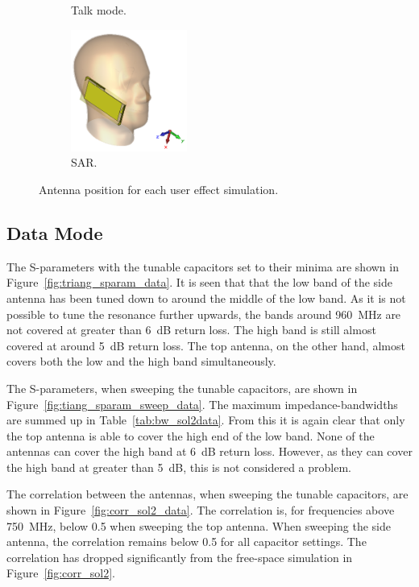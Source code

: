 \begin{figure}[htbp]
\begin{subfigure}[b]{0.24\linewidth}
        \caption{Talk mode.}
    \end{subfigure}
    \begin{subfigure}[b]{0.24\linewidth}
        \centering
        \includegraphics[width=\linewidth,height=4cm,keepaspectratio]{img/tech_sol/trianglefeed/sar/3d.PNG}
        \caption{SAR.}
    \end{subfigure}
    \caption{Antenna position for each user effect simulation.}
    \label{fig:triang_positions}
\end{figure}

\FloatBarrier
\subsection{Data Mode}
The S-parameters with the tunable capacitors set to their minima are shown in Figure~\ref{fig:triang_sparam_data}. It is seen that that the low band of the side antenna has been tuned down to around the middle of the low band. As it is not possible to tune the resonance further upwards, the bands around \SI{960}{MHz} are not covered at greater than \SI{6}{dB} return loss. The high band is still almost covered at around \SI{5}{dB} return loss. The top antenna, on the other hand, almost covers both the low and the high band simultaneously.

The S-parameters, when sweeping the tunable capacitors, are shown in Figure~\ref{fig:tiang_sparam_sweep_data}. The maximum impedance-bandwidths are summed up in Table~\ref{tab:bw_sol2data}. From this it is again clear that only the top antenna is able to cover the high end of the low band. None of the antennas can cover the high band at \SI{6}{dB} return loss. However, as they can cover the high band at greater than \SI{5}{dB}, this is not considered a problem.

The correlation between the antennas, when sweeping the tunable capacitors, are shown in Figure~\ref{fig:corr_sol2_data}. The correlation is, for frequencies above \SI{750}{MHz}, below 0.5 when sweeping the top antenna. When sweeping the side antenna, the correlation remains below 0.5 for all capacitor settings. The correlation has dropped significantly from the free-space simulation in Figure~\ref{fig:corr_sol2}.

